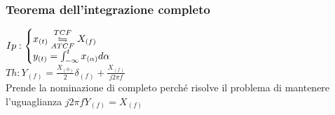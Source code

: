                 \subsubsection{Teorema dell'integrazione completo}\label{Teorema integrazione completo}
                    $Ip:\begin{cases}
                        x_{(t)} \overunderset{TCF}{ATCF}{\leftrightharpoons} X_{(f)}\\
                        y_{(t)} = \int_{-\infty}^{t} x_{(\alpha)} d\alpha
                    \end{cases}$\\
                    $Th: Y_{(f)} =\frac{X_{(0)}}{2}\delta_{(f)} +\frac{X_{(f)}}{j2\pi f}$ \\
                    
                    Prende la nominazione di completo perché risolve il problema di mantenere l'uguaglianza $j2\pi fY_{(f)} = X_{(f)}$
                    
